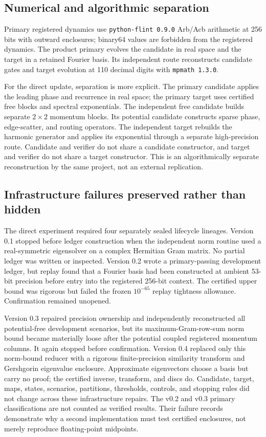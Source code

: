 \subsection{Numerical and algorithmic separation}

Primary registered dynamics use \texttt{python-flint 0.9.0} Arb/Acb arithmetic
at 256 bits with outward enclosures; binary64 values are forbidden from the
registered dynamics.  The product primary evolves the candidate in real space
and the target in a retained Fourier basis.  Its independent route reconstructs
candidate gates and target evolution at 110 decimal digits with
\texttt{mpmath 1.3.0}.

For the direct update, separation is more explicit.  The primary
candidate applies the leading phase and recurrence in real space; the primary
target uses certified free blocks and spectral exponentials.  The independent
free candidate builds separate $2\times2$ momentum blocks.  Its potential
candidate constructs sparse phase, edge-scatter, and routing operators.  The
independent target rebuilds the harmonic generator and applies its exponential
through a separate high-precision route.  Candidate and verifier do not share
a candidate constructor, and target and verifier do not share a target
constructor.  This is an algorithmically separate reconstruction by the same
project, not an external replication.

\subsection{Infrastructure failures preserved rather than hidden}

The direct experiment required four separately sealed lifecycle lineages.  Version
0.1 stopped before ledger construction when the independent norm routine used
a real-symmetric eigensolver on a complex Hermitian Gram matrix.  No partial
ledger was written or inspected.  Version 0.2 wrote a primary-passing
development ledger, but replay found that a Fourier basis had been constructed
at ambient 53-bit precision before entry into the registered 256-bit context.
The certified upper bound was rigorous but failed the frozen $10^{-65}$ replay
tightness allowance.  Confirmation remained unopened.

Version 0.3 repaired precision ownership and independently reconstructed all
potential-free development scenarios, but its maximum-Gram-row-sum norm bound
became materially loose after the potential coupled registered momentum
columns.  It again stopped before confirmation.  Version 0.4 replaced only
this norm-bound reducer with a rigorous finite-precision similarity transform and
Gershgorin eigenvalue enclosure.  Approximate eigenvectors choose a basis but
carry no proof; the certified inverse, transform, and discs do.  Candidate,
target, maps, states, scenarios, partitions, thresholds, controls, and stopping
rules did not change across these infrastructure repairs.  The v0.2 and v0.3
primary classifications are not counted as verified results.  Their failure
records demonstrate why a second implementation must test certified
enclosures, not merely reproduce floating-point midpoints.

